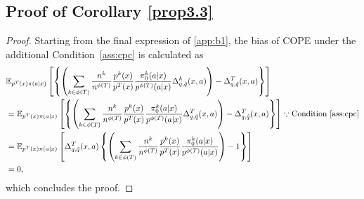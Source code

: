 \subsection{Proof of Corollary \ref{prop3.3}}
\begin{proof}
Starting from the final expression of \ref{app:b1}, 
the bias of COPE under the additional Condition~\ref{ass:cpc} is calculated as
\label{proof3.3}
\begin{align*}
&\mathbb{E}_{p^T(x)\pi(a|x)} \left[ \left\{ \left( \sum_{k\in\phi(T)} \frac{n^k}{n^{\phi(T)}}\frac{p^{k}(x)}{p^{T}(x)}\frac{\pi_0^{k}(a|x)}{p^{\phi(T)}(a|x)} \Delta_{q,\hat{q}}^k(x,a) \right)-\Delta_{q,\hat{q}}^T(x,a) \right\} \right]\\
&=
\mathbb{E}_{p^T(x)\pi(a|x)} \left[ \left\{ \left( \sum_{k\in\phi(T)} \frac{n^k}{n^{\phi(T)}}\frac{p^{k}(x)}{p^{T}(x)}\frac{\pi_0^{k}(a|x)}{p^{\phi(T)}(a|x)} \Delta_{q,\hat{q}}^T(x,a) \right)-\Delta_{q,\hat{q}}^T(x,a) \right\} \right] \because \text{Condition~\ref{ass:cpc}}\\
&=
\mathbb{E}_{p^T(x)\pi(a|x)} \left[ \Delta_{q,\hat{q}}^T(x,a)\left\{ \left( \sum_{k\in\phi(T)} \frac{n^k}{n^{\phi(T)}}\frac{p^{k}(x)}{p^{T}(x)}\frac{\pi_0^{k}(a|x)}{p^{\phi(T)}(a|x)} \right)-1 \right\} \right]\\
&= 0,
\end{align*}
which concludes the proof.

\end{proof}
